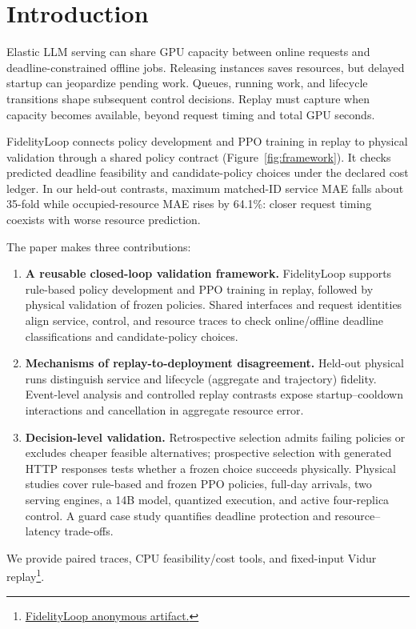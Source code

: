 \section{Introduction}
Elastic LLM serving can share GPU capacity between online requests and
deadline-constrained offline jobs. Releasing instances saves resources, but
delayed startup can jeopardize pending work. Queues, running work, and lifecycle
transitions shape subsequent control decisions. Replay must capture when
capacity becomes available, beyond request timing and total GPU seconds.

FidelityLoop connects policy development and PPO training in replay to
physical validation through a shared policy contract (Figure~\ref{fig:framework}).
It checks predicted deadline feasibility and candidate-policy choices under
the declared cost ledger. In our held-out contrasts, maximum
matched-ID service MAE falls about 35-fold while occupied-resource MAE rises by
64.1\%: closer request timing coexists with worse resource prediction.

The paper makes three contributions:
\begin{enumerate}[leftmargin=*]
\item \begin{minipage}[t]{\linewidth}
\textbf{A reusable closed-loop validation framework.} FidelityLoop supports rule-based policy development and PPO training in replay,
followed by physical validation of frozen policies. Shared
interfaces and request identities align service, control, and resource traces
to check online/offline deadline classifications and candidate-policy choices.
\end{minipage}
\item \textbf{Mechanisms of replay-to-deployment disagreement.} Held-out physical
runs distinguish service and lifecycle (aggregate and trajectory) fidelity.
Event-level analysis and controlled replay contrasts expose startup--cooldown
interactions and cancellation in aggregate resource error.
\item \textbf{Decision-level validation.} Retrospective selection admits failing policies or excludes cheaper feasible
alternatives; prospective selection with generated HTTP responses tests whether
a frozen choice succeeds physically. Physical studies cover
rule-based and frozen PPO policies, full-day arrivals, two serving engines,
a 14B model, quantized execution, and active four-replica control. A guard case study quantifies deadline
protection and resource--latency trade-offs.
\end{enumerate}
We provide paired traces, CPU feasibility/cost tools, and fixed-input Vidur replay\footnote{\href{https://anonymous.4open.science/r/FidelityLoop-144B/}{FidelityLoop anonymous artifact.}}.

